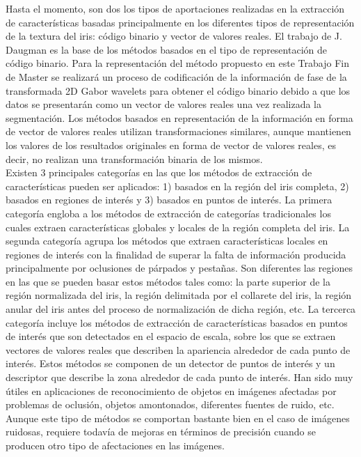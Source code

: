 Hasta el momento, son dos los tipos de aportaciones realizadas en la extracción de características basadas principalmente en los diferentes tipos de representación de la textura del iris: código binario y vector de valores reales. El trabajo de J. Daugman \cite{Reference15} es la base de los métodos basados en el tipo de representación de código binario. Para la representación del método propuesto en este Trabajo Fin de Master se realizará un proceso de codificación de la información de fase de la transformada 2D Gabor wavelets para obtener el código binario debido a que los datos se presentarán como un vector de valores reales una vez realizada la segmentación. Los métodos basados en representación de la información en forma de vector de valores reales utilizan transformaciones similares, aunque mantienen los valores de los resultados originales en forma de vector de valores reales, es decir, no realizan una transformación binaria de los mismos.\\

Existen 3 principales categorías en las que los métodos de extracción de características pueden ser aplicados: 1) basados en la región del iris completa, 2) basados en regiones de interés y 3) basados en puntos de interés. La primera categoría engloba a los métodos de extracción de categorías tradicionales los cuales extraen características globales y locales de la región completa del iris. La segunda categoría agrupa los métodos que extraen características locales en regiones de interés con la finalidad de superar la falta de información producida principalmente por oclusiones de párpados y pestañas. Son diferentes las regiones en las que se pueden basar estos métodos tales como: la parte superior de la región normalizada del iris, la región delimitada por el collarete del iris, la región anular del iris antes del proceso de normalización de dicha región, etc. La tercerca categoría incluye los métodos de extracción de características basados en puntos de interés que son detectados en el espacio de escala, sobre los que se extraen vectores de valores reales que describen la apariencia alrededor de cada punto de interés. Estos métodos se componen de un detector de puntos de interés y un descriptor que describe la zona alrededor de cada punto de interés. Han sido muy útiles en aplicaciones de reconocimiento de objetos en imágenes afectadas por problemas de oclusión, objetos amontonados, diferentes fuentes de ruido, etc. Aunque este tipo de métodos se comportan bastante bien en el caso de imágenes ruidosas, requiere todavía de mejoras en términos de precisión cuando se producen otro tipo de afectaciones en las imágenes. \\ \\

